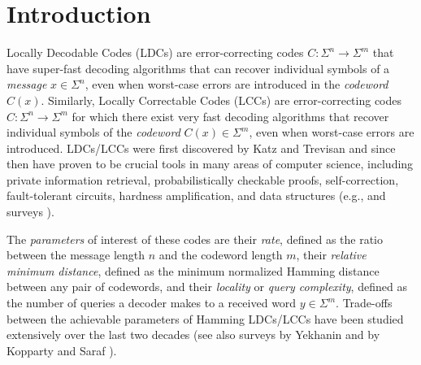 \section{Introduction}\label{sec:intro}

Locally Decodable Codes (LDCs) \cite{KatzT00, SudanTV99} are error-correcting codes $C: \Sigma^n \rightarrow \Sigma^m$ that have super-fast decoding algorithms that can recover individual symbols of a {\em message} $x\in \Sigma^n$, even when worst-case errors are introduced in the {\em codeword} $C(x)$. Similarly, Locally Correctable Codes (LCCs) are error-correcting codes $C: \Sigma^n \rightarrow \Sigma^m$ for which there exist very fast decoding algorithms that recover individual symbols of the {\em codeword} $C(x)\in \Sigma^m$, even when worst-case errors are introduced. LDCs/LCCs were first discovered by Katz and Trevisan \cite{KatzT00} and since then 
have proven to be crucial tools in many areas of computer science, including private information retrieval, probabilistically checkable proofs, self-correction,  fault-tolerant circuits,  hardness amplification, and data structures (e.g., \cite{BabaiFLS91,LundFKN92,BlumLR93,BlumK95,ChorKGS98,ChenGW13,AndoniLRW17} and surveys \cite{Tre04-survey,Gasarch04}).

The {\em parameters} of interest of these codes are their {\em  rate}, defined as the ratio between the message length $n$ and the codeword length $m$,  their {\em relative minimum distance}, defined as the minimum normalized Hamming distance between any pair of codewords, and their {\em locality} or {\em query complexity}, defined as the number of queries a decoder makes to a received word  $y\in \Sigma^m$. Trade-offs between the achievable parameters of Hamming LDCs/LCCs have been studied extensively over the last two decades \cite{KerenidisW04, WehnerW05, GoldreichKST06, Woodruff07, Yekhanin08, Yekhanin12, DvirGY11, Efremenko12,GalM12, BhattacharyyaDS16, BhattacharyyaG17, bhattacharyya2017lower, DvirSW17,KoppartyMRS17, BhattacharyyaCG20} (see also surveys by Yekhanin \cite{Yekhanin12} and by Kopparty and Saraf \cite{KoppartyS16}). 

